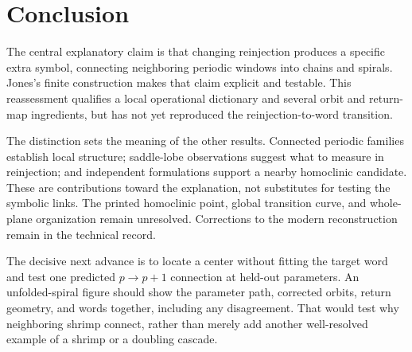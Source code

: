 \section{Conclusion}
\label{sec:conclusion}

The central explanatory claim is that changing reinjection produces a
specific extra symbol, connecting neighboring periodic windows into chains
and spirals. Jones's finite construction makes that claim explicit and
testable. This reassessment qualifies a local operational dictionary and
several orbit and return-map ingredients, but has not yet reproduced the
reinjection-to-word transition.

The distinction sets the meaning of the other results. Connected periodic
families establish local structure; saddle-lobe observations suggest what
to measure in reinjection; and independent formulations support a nearby
homoclinic candidate. These are contributions toward the explanation, not
substitutes for testing the symbolic links. The printed homoclinic point,
global transition curve, and whole-plane organization remain unresolved.
Corrections to the modern reconstruction remain in the technical record.

The decisive next advance is to locate a center without fitting the target
word and test one predicted $p\to p+1$ connection at held-out parameters.
An unfolded-spiral figure should show the parameter path, corrected orbits,
return geometry, and words together, including any disagreement. That would
test why neighboring shrimp connect, rather than merely add another
well-resolved example of a shrimp or a doubling cascade.
